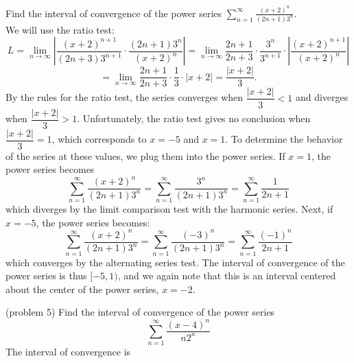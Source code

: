 \documentclass[handout]{ximera}
\begin{document}
\begin{example}[example 5]
Find the interval of convergence of the power series $\displaystyle{\sum_{n=1}^\infty \frac{(x+2)^n}{(2n+1)3^n}}$.\\
We will use the ratio test:
\[
L = \lim_{n \to \infty} \left|\frac{(x+2)^{n+1}}{(2n+3)3^{n+1}} \cdot \frac{(2n+1) 3^n}{(x+2)^n} \right| = 
\lim_{n \to \infty} \frac{2n+1}{2n+3} \cdot \frac{3^n}{3^{n+1}} \cdot \left|  \frac{(x+2)^{n+1}}{(x+2)^n} \right| 
\]
\[
= \lim_{n \to \infty} \frac{2n+1}{2n+3} \cdot \frac13 \cdot \left|  x+2 \right| = \frac{|x+2|}{3}.
\]
By the rules for the ratio test, the series converges when $\dfrac{|x+2|}{3} < 1$ and diverges when $\dfrac{|x+2|}{3} > 1$.
Unfortunately, the ratio test gives no conclusion when $\dfrac{|x+2|}{3} = 1$, which corresponds to $x = -5$ and $x = 1$.
To determine the behavior of the series at these values, we plug them into the power series.
If $x = 1$, the power series becomes
\[
\sum_{n=1}^\infty \frac{(x+2)^n}{(2n+1)3^n} = \sum_{n=1}^\infty \frac{3^n}{(2n+1)3^n} = \sum_{n=1}^\infty \frac{1}{2n+1}
\]
which diverges by the limit comparison test with the harmonic series.
Next, if $x = -5$, the power series becomes:
\[
\sum_{n=1}^\infty \frac{(x+2)^n}{(2n+1)3^n} = \sum_{n=1}^\infty \frac{(-3)^n}{(2n+1)3^n} = \sum_{n=1}^\infty \frac{(-1)^n}{2n+1}
\]
which converges by the alternating series test.
The interval of convergence of the power series is thus $[-5, 1)$, and we again note that this is an interval centered about the 
center of the power series, $x = -2$.
\end{example}




\begin{problem}(problem 5)
Find the interval of convergence of the power series
\[
\sum_{n=1}^\infty \frac{(x-4)^n}{n2^n}
\]
The interval of convergence is
\begin{multipleChoice}
\choice[correct]{$[2, 6)$}
\choice{$(2, 6]$}
\choice{$[2, 6]$}
\end{multipleChoice}
\end{problem}



\begin{center}
\begin{foldable}
\end{foldable}
\end{center}
\end{document}
